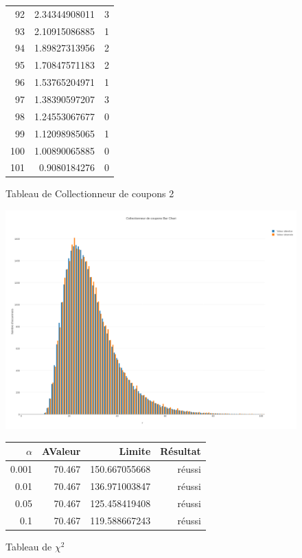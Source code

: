 \documentclass[10pt,a4paper]{article}
\begin{document}
\begin{figure}[h]
\begin{tabular}{|r|r|r|}
92 & 2.34344908011 & 3\\
93 & 2.10915086885 & 1\\
94 & 1.89827313956 & 2\\
95 & 1.70847571183 & 2\\
96 & 1.53765204971 & 1\\
97 & 1.38390597207 & 3\\
98 & 1.24553067677 & 0\\
99 & 1.12098985065 & 1\\
100 & 1.00890065885 & 0\\
101 & 0.9080184276 & 0\\
\hline
\end{tabular}
\caption{Tableau de Collectionneur de coupons 2}
\end{figure}

\begin{figure}[h]
\centering
\includegraphics[scale=0.25]{../chart_images/collectionneur_de_coupons_bar_chart.png}
\end{figure}

\begin{figure}[h]
\centering
\begin{tabular}{|r|r|r|r|}
\hline
$\alpha$ & AValeur & Limite & Résultat\\
\hline
0.001 & 70.467 & 150.667055668 & réussi\\
0.01 & 70.467 & 136.971003847 & réussi\\
0.05 & 70.467 & 125.458419408 & réussi\\
0.1 & 70.467 & 119.588667243 & réussi\\
\hline
\end{tabular}
\caption{Tableau de $\chi^2$}
\end{figure}
\end{document}
